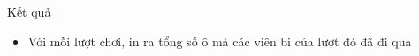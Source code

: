 Kết quả  
\begin{itemize}
	\item     Với mỗi lượt chơi, in ra tổng số ô mà các viên bi của lượt đó đã đi qua   
\end{itemize}